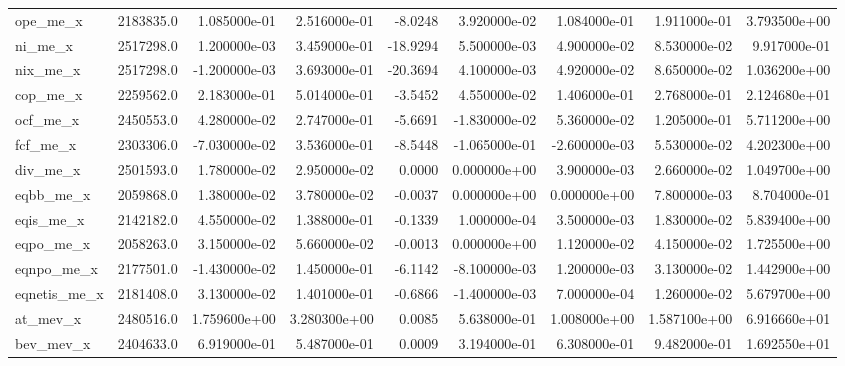 \documentclass[10pt]{article}
\begin{document}
\begin{landscape}
\begin{longtable}{|l|r|r|r|r|r|r|r|r|}
ope\_me\_x                &  2183835.0 &  1.085000e-01 &  2.516000e-01 &     -8.0248 &  3.920000e-02 &  1.084000e-01 &  1.911000e-01 &  3.793500e+00 \\
ni\_me\_x                 &  2517298.0 &  1.200000e-03 &  3.459000e-01 &    -18.9294 &  5.500000e-03 &  4.900000e-02 &  8.530000e-02 &  9.917000e-01 \\
nix\_me\_x                &  2517298.0 & -1.200000e-03 &  3.693000e-01 &    -20.3694 &  4.100000e-03 &  4.920000e-02 &  8.650000e-02 &  1.036200e+00 \\
cop\_me\_x                &  2259562.0 &  2.183000e-01 &  5.014000e-01 &     -3.5452 &  4.550000e-02 &  1.406000e-01 &  2.768000e-01 &  2.124680e+01 \\
ocf\_me\_x                &  2450553.0 &  4.280000e-02 &  2.747000e-01 &     -5.6691 & -1.830000e-02 &  5.360000e-02 &  1.205000e-01 &  5.711200e+00 \\
fcf\_me\_x                &  2303306.0 & -7.030000e-02 &  3.536000e-01 &     -8.5448 & -1.065000e-01 & -2.600000e-03 &  5.530000e-02 &  4.202300e+00 \\
div\_me\_x                &  2501593.0 &  1.780000e-02 &  2.950000e-02 &      0.0000 &  0.000000e+00 &  3.900000e-03 &  2.660000e-02 &  1.049700e+00 \\
eqbb\_me\_x               &  2059868.0 &  1.380000e-02 &  3.780000e-02 &     -0.0037 &  0.000000e+00 &  0.000000e+00 &  7.800000e-03 &  8.704000e-01 \\
eqis\_me\_x               &  2142182.0 &  4.550000e-02 &  1.388000e-01 &     -0.1339 &  1.000000e-04 &  3.500000e-03 &  1.830000e-02 &  5.839400e+00 \\
eqpo\_me\_x               &  2058263.0 &  3.150000e-02 &  5.660000e-02 &     -0.0013 &  0.000000e+00 &  1.120000e-02 &  4.150000e-02 &  1.725500e+00 \\
eqnpo\_me\_x              &  2177501.0 & -1.430000e-02 &  1.450000e-01 &     -6.1142 & -8.100000e-03 &  1.200000e-03 &  3.130000e-02 &  1.442900e+00 \\
eqnetis\_me\_x            &  2181408.0 &  3.130000e-02 &  1.401000e-01 &     -0.6866 & -1.400000e-03 &  7.000000e-04 &  1.260000e-02 &  5.679700e+00 \\
at\_mev\_x                &  2480516.0 &  1.759600e+00 &  3.280300e+00 &      0.0085 &  5.638000e-01 &  1.008000e+00 &  1.587100e+00 &  6.916660e+01 \\
bev\_mev\_x               &  2404633.0 &  6.919000e-01 &  5.487000e-01 &      0.0009 &  3.194000e-01 &  6.308000e-01 &  9.482000e-01 &  1.692550e+01 \\

\end{longtable}
\end{landscape}
\end{document}
